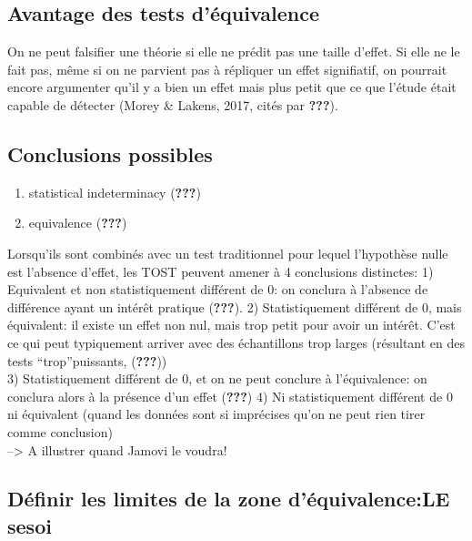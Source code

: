 \documentclass[
  english,
  man]{apa6}
\providecommand{\tightlist}{%
  \setlength{\itemsep}{0pt}\setlength{\parskip}{0pt}}
\begin{document}
\hypertarget{avantage-des-tests-duxe9quivalence}{%
\subsection{Avantage des tests d'équivalence}\label{avantage-des-tests-duxe9quivalence}}

On ne peut falsifier une théorie si elle ne prédit pas une taille d'effet. Si elle ne le fait pas, même si on ne parvient pas à répliquer un effet signifiatif, on pourrait encore argumenter qu'il y a bien un effet mais plus petit que ce que l'étude était capable de détecter (Morey \& Lakens, 2017, cités par {\textbf{???}}).

\hypertarget{conclusions-possibles}{%
\subsection{Conclusions possibles}\label{conclusions-possibles}}

\begin{enumerate}
\def\labelenumi{\arabic{enumi})}
\tightlist
\item
  statistical indeterminacy ({\textbf{???}})
\item
  equivalence ({\textbf{???}})
\end{enumerate}

Lorsqu'ils sont combinés avec un test traditionnel pour lequel l'hypothèse nulle est l'absence d'effet, les TOST peuvent amener à 4 conclusions distinctes:
1) Equivalent et non statistiquement différent de 0: on conclura à l'absence de différence ayant un intérêt pratique ({\textbf{???}}).
2) Statistiquement différent de 0, mais équivalent: il existe un effet non nul, mais trop petit pour avoir un intérêt. C'est ce qui peut typiquement arriver avec des échantillons trop larges (résultant en des tests \enquote{trop}puissants, ({\textbf{???}}))\\
3) Statistiquement différent de 0, et on ne peut conclure à l'équivalence: on conclura alors à la présence d'un effet ({\textbf{???}})
4) Ni statistiquement différent de 0 ni équivalent (quand les données sont si imprécises qu'on ne peut rien tirer comme conclusion)\\
--\textgreater{} A illustrer quand Jamovi le voudra!

\hypertarget{duxe9finir-les-limites-de-la-zone-duxe9quivalencele-sesoi}{%
\subsection{Définir les limites de la zone d'équivalence:LE sesoi}\label{duxe9finir-les-limites-de-la-zone-duxe9quivalencele-sesoi}}
\end{document}
